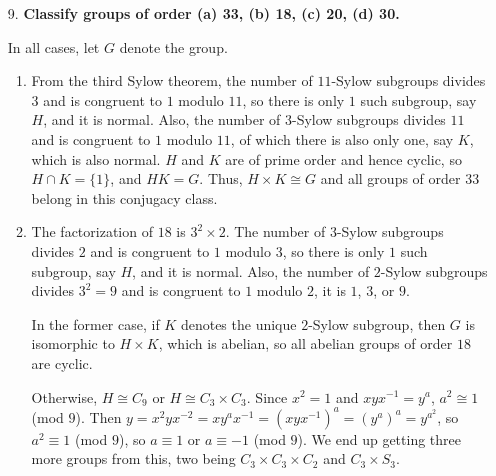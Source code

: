 \documentclass[a4paper,12pt]{article}
\begin{document}
\begin{enumerate}
    \item[9.]
        \boldmath
        \textbf{Classify groups of order (a) 33, (b) 18, (c) 20, (d) 30.} \par
        \unboldmath
        In all cases, let $G$ denote the group.
        \begin{enumerate}
            \item
                From the third Sylow theorem, the number of $11$-Sylow subgroups divides $3$ and is congruent to $1$ modulo $11$, so there is only $1$ such subgroup, say $H$, and it is normal. Also, the number of $3$-Sylow subgroups divides $11$ and is congruent to $1$ modulo $11$, of which there is also only one, say $K$, which is also normal. $H$ and $K$ are of prime order and hence cyclic, so $H \cap K = \{ 1 \}$, and $HK = G$. Thus, $H \times K \cong G$ and all groups of order 33 belong in this conjugacy class.

            \item
                The factorization of $18$ is $3^2 \times 2$. The number of $3$-Sylow subgroups divides $2$ and is congruent to $1$ modulo $3$, so there is only $1$ such subgroup, say $H$, and it is normal. Also, the number of $2$-Sylow subgroups divides $3^2 = 9$ and is congruent to $1$ modulo $2$, it is $1$, $3$, or $9$. \par
                In the former case, if $K$ denotes the unique $2$-Sylow subgroup, then $G$ is isomorphic to $H \times K$, which is abelian, so all abelian groups of order $18$ are cyclic. \par
                Otherwise, $H \cong C_9$ or $H \cong C_3 \times C_3$. Since $x^2 = 1$ and $xyx^{-1} = y^a$, $a^2 \cong 1$ (mod $9$). Then $y = x^2 y x^{-2} = xy^a x^{-1} = (xyx^{-1})^a = (y^a)^a = y^{a^2}$, so $a^2 \equiv 1$ (mod $9$), so $a \equiv 1$ or $a \equiv -1$ (mod $9$). We end up getting three more groups from this, two being $C_3 \times C_3 \times C_2$ and $C_3 \times S_3$. 


\end{enumerate}
\end{enumerate}
\end{document}
